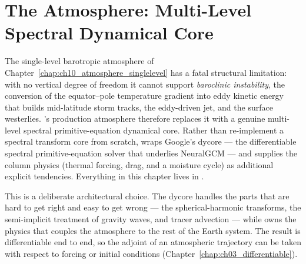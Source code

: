 \chapter{The Atmosphere: Multi-Level Spectral Dynamical Core}\label{chap:ch09_atmosphere_multilevel}

\providecommand{\sig}{\sigma}                 %
\providecommand{\sigd}{\dot{\sigma}}          %
\providecommand{\dvg}{\delta}                 %
\providecommand{\Tref}{\overline{T}}          %
\providecommand{\Tvar}{T'}                     %
\providecommand{\Teq}{T_{\mathrm{eq}}}        %
\providecommand{\qhum}{q}                      %
\providecommand{\Lv}{L_v}                      %

The single-level barotropic atmosphere of Chapter~\ref{chap:ch10_atmosphere_singlelevel}
has a fatal structural limitation: with no vertical degree of freedom it cannot
support \emph{baroclinic instability}, the conversion of the equator--pole
temperature gradient into eddy kinetic energy that builds mid-latitude storm
tracks, the eddy-driven jet, and the surface westerlies. \model{}'s production
atmosphere therefore replaces it with a genuine multi-level spectral
primitive-equation dynamical core. Rather than re-implement a spectral transform
core from scratch, \model{} wraps Google's \dino{} dycore --- the differentiable
\jax{} spectral primitive-equation solver \citep{dinosaur_software} that underlies NeuralGCM
\citep{kochkov2024neuralgcm} --- and supplies the column physics
(thermal forcing, drag, and a moisture cycle) as additional explicit tendencies.
Everything in this chapter lives in
.

This is a deliberate architectural choice. The dycore handles the parts that are
hard to get right and easy to get wrong --- the spherical-harmonic transforms,
the semi-implicit treatment of gravity waves, and tracer advection --- while
\model{} owns the physics that couples the atmosphere to the rest of the Earth
system. The result is differentiable end to end, so the adjoint of an atmospheric
trajectory can be taken with respect to forcing or initial conditions
(Chapter~\ref{chap:ch03_differentiable}).

